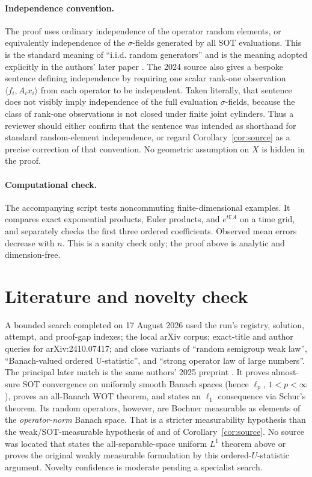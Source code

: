 \documentclass[11pt]{article}
\newcommand{\E}{\mathbb E}
\begin{document}
\paragraph{Independence convention.}
The proof uses ordinary independence of the operator random elements, or
equivalently independence of the $\sigma$-fields generated by all SOT
evaluations.  This is the standard meaning of ``i.i.d. random generators''
and is the meaning adopted explicitly in the authors' later paper
\cite{DS25}.  The 2024 source also gives a bespoke sentence defining
independence by requiring one scalar rank-one observation
$\langle f_i,A_ix_i\rangle$ from each operator to be independent.  Taken
literally, that sentence does not visibly imply independence of the full
evaluation $\sigma$-fields, because the class of rank-one observations is not
closed under finite joint cylinders.  Thus a reviewer should either confirm
that the sentence was intended as shorthand for standard random-element
independence, or regard Corollary~\ref{cor:source} as a precise correction of
that convention.  No geometric assumption on $X$ is hidden in the proof.

\paragraph{Computational check.}
The accompanying script tests noncommuting finite-dimensional examples.  It
compares exact exponential products, Euler products, and $e^{t\E A}$ on a
time grid, and separately checks the first three ordered coefficients.
Observed mean errors decrease with $n$.  This is a sanity check only; the
proof above is analytic and dimension-free.

\section{Literature and novelty check}

A bounded search completed on 17 August 2026 used the run's registry,
solution, attempt, and proof-gap indexes; the local arXiv corpus; exact-title
and author queries for arXiv:2410.07417; and close variants of ``random
semigroup weak law'', ``Banach-valued ordered U-statistic'', and ``strong
operator law of large numbers''.  The principal later match is the same
authors' 2025 preprint \cite{DS25}.  It proves almost-sure SOT convergence on
uniformly smooth Banach spaces (hence $\ell_p$, $1<p<\infty$), proves an
all-Banach WOT theorem, and states an $\ell_1$ consequence via Schur's
theorem.  Its random operators, however, are Bochner measurable as elements
of the \emph{operator-norm} Banach space.  That is a stricter measurability
hypothesis than the weak/SOT-measurable hypothesis of \cite{DS24} and of
Corollary~\ref{cor:source}.  No source was located that states the
all-separable-space uniform $L^1$ theorem above or proves the original weakly
measurable formulation by this ordered-$U$-statistic argument.  Novelty
confidence is moderate pending a specialist search.
\end{document}
